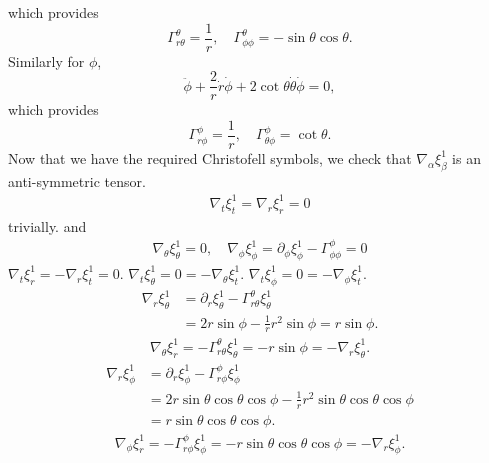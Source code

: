 \documentclass[fleqn]{article}
\begin{document}
\begin{enumerate}
  which provides
  \begin{equation}
    \label{eq:Gamma-theta}
    \Gamma^\theta_{r\theta} = \frac{1}{r},\quad\Gamma^\theta_{\phi\phi} = - \sin\theta\cos\theta.
  \end{equation}
  Similarly for $\phi$,
  \begin{equation}
    \label{eq:phi-e-o-m}
    \ddot{\phi} + \frac{2}{r}\dot{r}\dot{\phi}+2\cot\theta\dot{\theta}\dot{\phi} = 0,
  \end{equation}
  which provides
  \begin{equation}
    \label{eq:Gamma-phi}
    \Gamma^\phi_{r\phi}= \frac{1}{r},\quad\Gamma^\phi_{\theta\phi} = \cot\theta.
  \end{equation}
  Now that we have the required Christofell symbols, we check that $\nabla_\alpha\xi^1_\beta$ is an anti-symmetric tensor.
  \begin{align*}
    \boxed{\nabla_t\xi^1_t = \nabla_r\xi^1_r = 0}
  \end{align*}
  trivially. and
  \begin{align*}
    \boxed{\nabla_\theta\xi^1_\theta = 0,\quad \nabla_\phi\xi^1_\phi = \partial_\phi\xi^1_\phi - \Gamma^\phi_{\phi\phi} = 0}
  \end{align*}
  $\nabla_t \xi^1_r = - \nabla_r\xi^1_t = 0$. $\nabla_t\xi^1_\theta = 0 = - \nabla_\theta\xi^1_t$. $\nabla_t\xi^1_\phi = 0 = - \nabla_\phi\xi^1_t$.
  \begin{align*}
    \nabla_r\xi^1_\theta
    & = \partial_r\xi^1_\theta - \Gamma^{\theta}_{r\theta}\xi^1_\theta\\
    & = 2r\sin\phi - \frac{1}{r}r^2 \sin\phi = r\sin\phi.
  \end{align*}
  \begin{align*}
    \boxed{\nabla_\theta\xi^1_r = - \Gamma^\theta_{r\theta}\xi^1_\theta = - r\sin\phi = - \nabla_r\xi^1_\theta}.
  \end{align*}
  \begin{align*}
    \nabla_r\xi^1_\phi
    & = \partial_r\xi^1_\phi - \Gamma^\phi_{r\phi}\xi^1_\phi\\
    & = 2r\sin\theta\cos\theta\cos\phi - \frac{1}{r} r^2\sin\theta\cos\theta\cos\phi\\
    & = r\sin\theta\cos\theta\cos\phi.
  \end{align*}
  \begin{align*}
    \boxed{\nabla_\phi\xi^1_r = - \Gamma^\phi_{r\phi}\xi^1_\phi = - r\sin\theta\cos\theta\cos\phi = - \nabla_r\xi^1_\phi}.
  \end{align*}

\end{enumerate}
\end{document}
